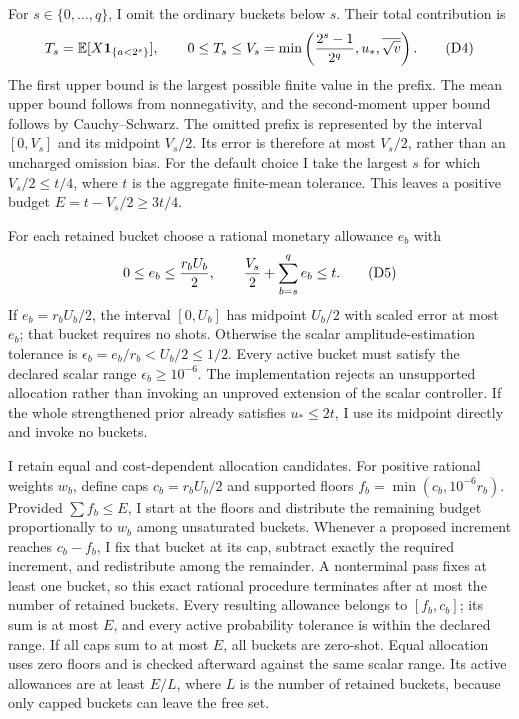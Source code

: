 For \(s\in\{0,\ldots,q\}\), I omit the ordinary buckets below \(s\). Their total contribution is
\[
 T_s=\mathbb E[X\mathbf1_{\{a<2^s\}}],\qquad
 0\leq T_s\leq V_s=
 \min\left({2^s-1\over2^q},u_*,\overline{\sqrt v}\right).
 \tag{D4}\label{eq:dyadic-tail-bound}
\]
The first upper bound is the largest possible finite value in the prefix. The mean upper bound follows from nonnegativity, and the second-moment upper bound follows by Cauchy--Schwarz. The omitted prefix is represented by the interval \([0,V_s]\) and its midpoint \(V_s/2\). Its error is therefore at most \(V_s/2\), rather than an uncharged omission bias. For the default choice I take the largest \(s\) for which \(V_s/2\leq t/4\), where \(t\) is the aggregate finite-mean tolerance. This leaves a positive budget
\(E=t-V_s/2\geq3t/4\).

For each retained bucket choose a rational monetary allowance \(e_b\) with
\[
 0\leq e_b\leq{r_bU_b\over2},\qquad
 {V_s\over2}+\sum_{b=s}^q e_b\leq t.
 \tag{D5}\label{eq:dyadic-error-budget}
\]
If \(e_b=r_bU_b/2\), the interval \([0,U_b]\) has midpoint \(U_b/2\) with scaled error at most \(e_b\); that bucket requires no shots. Otherwise the scalar amplitude-estimation tolerance is \(\epsilon_b=e_b/r_b<U_b/2\leq1/2\). Every active bucket must satisfy the declared scalar range \(\epsilon_b\geq10^{-6}\). The implementation rejects an unsupported allocation rather than invoking an unproved extension of the scalar controller. If the whole strengthened prior already satisfies \(u_*\leq2t\), I use its midpoint directly and invoke no buckets.

I retain equal and cost-dependent allocation candidates. For positive rational weights \(w_b\), define caps \(c_b=r_bU_b/2\) and supported floors
\(f_b=\min(c_b,10^{-6}r_b)\). Provided \(\sum f_b\leq E\), I start at the floors and distribute the remaining budget proportionally to \(w_b\) among unsaturated buckets. Whenever a proposed increment reaches \(c_b-f_b\), I fix that bucket at its cap, subtract exactly the required increment, and redistribute among the remainder. A nonterminal pass fixes at least one bucket, so this exact rational procedure terminates after at most the number of retained buckets. Every resulting allowance belongs to \([f_b,c_b]\); its sum is at most \(E\), and every active probability tolerance is within the declared range. If all caps sum to at most \(E\), all buckets are zero-shot. Equal allocation uses zero floors and is checked afterward against the same scalar range. Its active allowances are at least \(E/L\), where \(L\) is the number of retained buckets, because only capped buckets can leave the free set.

